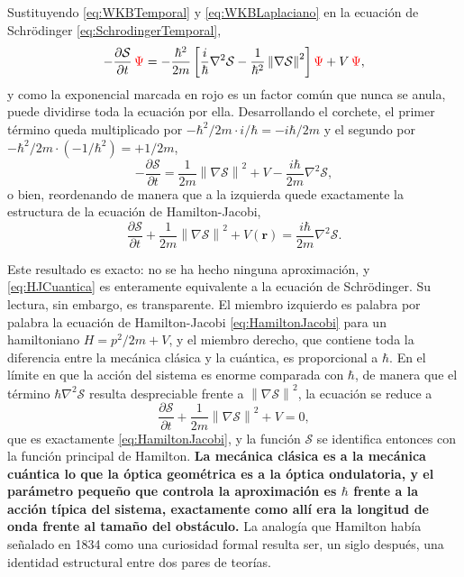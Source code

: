         Sustituyendo \eqref{eq:WKBTemporal} y \eqref{eq:WKBLaplaciano} en la ecuación de Schrödinger \eqref{eq:SchrodingerTemporal},
        \begin{equation}\label{eq:WKBSustituida}
            -\frac{\partial\mathcal{S}}{\partial t}\,\textcolor{red}{\Psi}
            = -\frac{\hbar^{2}}{2m}\left[\frac{i}{\hbar}\nabla^{2}\mathcal{S} - \frac{1}{\hbar^{2}}\left\|\nabla\mathcal{S}\right\|^{2}\right]\textcolor{red}{\Psi} + V\,\textcolor{red}{\Psi},
        \end{equation}
        y como la exponencial marcada en rojo es un factor común que nunca se anula, puede dividirse toda la ecuación por ella. Desarrollando el corchete, el primer término queda multiplicado por $-\hbar^{2}/2m\cdot i/\hbar = -i\hbar/2m$ y el segundo por $-\hbar^{2}/2m\cdot(-1/\hbar^{2}) = +1/2m$,
        \begin{equation}\label{eq:WKBExacta}
            -\frac{\partial\mathcal{S}}{\partial t} = \frac{1}{2m}\left\|\nabla\mathcal{S}\right\|^{2} + V - \frac{i\hbar}{2m}\nabla^{2}\mathcal{S},
        \end{equation}
        o bien, reordenando de manera que a la izquierda quede exactamente la estructura de la ecuación de Hamilton-Jacobi,
        \begin{equation}\label{eq:HJCuantica}
            \boxed{\;\frac{\partial\mathcal{S}}{\partial t} + \frac{1}{2m}\left\|\nabla\mathcal{S}\right\|^{2} + V(\mathbf{r}) = \frac{i\hbar}{2m}\nabla^{2}\mathcal{S} .\;}
        \end{equation}

        Este resultado es exacto: no se ha hecho ninguna aproximación, y \eqref{eq:HJCuantica} es enteramente equivalente a la ecuación de Schrödinger. Su lectura, sin embargo, es transparente. El miembro izquierdo es palabra por palabra la ecuación de Hamilton-Jacobi \eqref{eq:HamiltonJacobi} para un hamiltoniano $H = p^{2}/2m + V$, y el miembro derecho, que contiene toda la diferencia entre la mecánica clásica y la cuántica, es proporcional a $\hbar$. En el límite en que la acción del sistema es enorme comparada con $\hbar$, de manera que el término $\hbar\nabla^{2}\mathcal{S}$ resulta despreciable frente a $\left\|\nabla\mathcal{S}\right\|^{2}$, la ecuación se reduce a
        \begin{equation}\label{eq:HJRecuperada}
            \frac{\partial\mathcal{S}}{\partial t} + \frac{1}{2m}\left\|\nabla\mathcal{S}\right\|^{2} + V = 0,
        \end{equation}
        que es exactamente \eqref{eq:HamiltonJacobi}, y la función $\mathcal{S}$ se identifica entonces con la función principal de Hamilton. \textbf{La mecánica clásica es a la mecánica cuántica lo que la óptica geométrica es a la óptica ondulatoria, y el parámetro pequeño que controla la aproximación es $\hbar$ frente a la acción típica del sistema, exactamente como allí era la longitud de onda frente al tamaño del obstáculo.} La analogía que Hamilton había señalado en 1834 como una curiosidad formal resulta ser, un siglo después, una identidad estructural entre dos pares de teorías.

